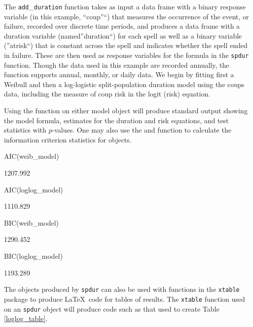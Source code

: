 \documentclass[article]{jss}
\begin{document}
\normalsize
The \texttt{add}\_\texttt{duration} function takes as input a data frame
with a binary response variable (in this example, ``coup''``) that
measures the occurrence of the event, or failure, recorded over discrete
time periods, and produces a data frame with a duration variable
(named''duration``) for each spell as well as a binary variable
(''atrisk``) that is constant across the spell and indicates whether the
spell ended in failure. These are then used as response variables for
the formula in the \texttt{spdur} function. Though the data used in this
example are recorded annually, the function supports annual, monthly, or
daily data. We begin by fitting first a Weibull and then a log-logistic
split-population duration model using the coups data, including the
measure of coup risk in the logit (risk) equation.

Using the  function on either model object will produce
standard output showing the model formula, estimates for the duration
and risk equations, and test statistics with \(p\)-values. One may also
use the  and  function to calculate the information
criterion statistics for  objects.

\begin{CodeChunk}
\begin{CodeInput}
AIC(weib_model)
\end{CodeInput}
\begin{CodeOutput}
[1] 1207.992
\end{CodeOutput}
\begin{CodeInput}
AIC(loglog_model)
\end{CodeInput}
\begin{CodeOutput}
[1] 1110.829
\end{CodeOutput}
\begin{CodeInput}
BIC(weib_model)
\end{CodeInput}
\begin{CodeOutput}
[1] 1290.452
\end{CodeOutput}
\begin{CodeInput}
BIC(loglog_model)
\end{CodeInput}
\begin{CodeOutput}
[1] 1193.289
\end{CodeOutput}
\end{CodeChunk}

The objects produced by \texttt{spdur} can also be used with functions
in the \texttt{xtable} package to produce \LaTeX~code for tables of
results. The \texttt{xtable} function used on an \texttt{spdur} object
will produce code such as that used to create Table \ref{loglog_table}.
\end{document}
